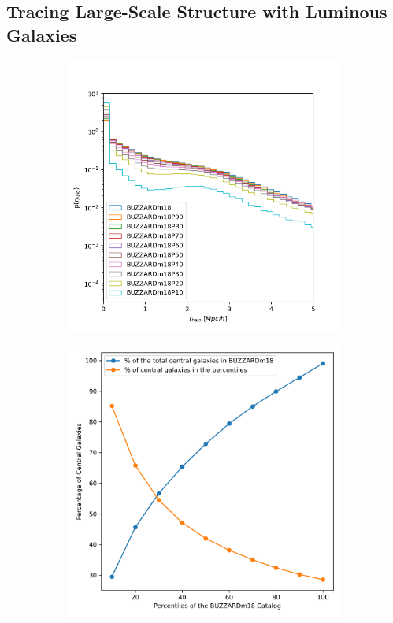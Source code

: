 \subsection{Tracing Large-Scale Structure with Luminous Galaxies}

\begin{figure}[h!]
    \centering
    \begin{subfigure}{0.5\textwidth}
        \centering
        \includegraphics[width=\textwidth]{figures/rhalo_percentile.png}
    \end{subfigure}
    \hfill
    \begin{subfigure}{0.45\textwidth}
        \centering
        \includegraphics[width=\textwidth]{figures/central_gal.png}

\end{subfigure}
\end{figure}
